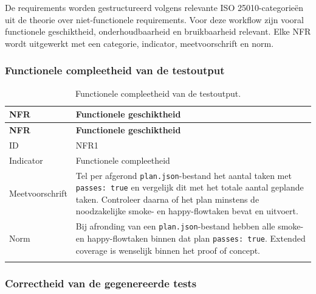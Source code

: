 De requirements worden gestructureerd volgens relevante ISO 25010-categorieën uit de theorie over niet-functionele requirements. Voor deze workflow zijn vooral functionele geschiktheid, onderhoudbaarheid en bruikbaarheid relevant. Elke NFR wordt uitgewerkt met een categorie, indicator, meetvoorschrift en norm.

\subsubsection{Functionele compleetheid van de testoutput}


\begin{longtable}{p{}p{}}
    \toprule
    \textbf{NFR} & \textbf{Functionele geschiktheid} \\
    \midrule
    \endfirsthead
    
    \toprule
    \textbf{NFR} & \textbf{Functionele geschiktheid} \\
    \midrule
    \endhead
    
    ID & NFR1 \\
    \midrule
    Indicator & Functionele compleetheid \\
    \midrule
    Meetvoorschrift & Tel per afgerond \texttt{plan.json}-bestand het aantal taken met \texttt{passes: true} en vergelijk dit met het totale aantal geplande taken. Controleer daarna of het plan minstens de noodzakelijke smoke- en happy-flowtaken bevat en uitvoert. \\
    \midrule
    Norm & Bij afronding van een \texttt{plan.json}-bestand hebben alle smoke- en happy-flowtaken binnen dat plan \texttt{passes: true}. Extended coverage is wenselijk binnen het proof of concept. \\
    
    \bottomrule
    \caption[NFR1: functionele compleetheid]{Functionele compleetheid van de testoutput.}
    \label{tab:nfr-functionele-compleetheid}
\end{longtable}

\subsubsection{Correctheid van de gegenereerde tests}

